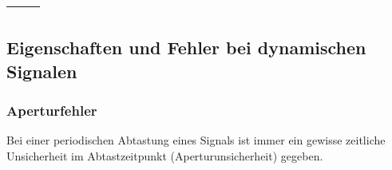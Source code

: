 \begin{longtable}[c]{| p{6cm} | p{6cm} | p{6cm} | }
\begin{minipage}{6cm}
\begin{center}
\end{center}
\end{minipage}
 \\
\hline

\end{longtable}

\subsection{Eigenschaften und Fehler bei dynamischen Signalen}
\subsubsection{Aperturfehler}
Bei einer periodischen Abtastung eines Signals ist immer ein gewisse zeitliche
Unsicherheit im Abtastzeitpunkt (Aperturunsicherheit) gegeben.

